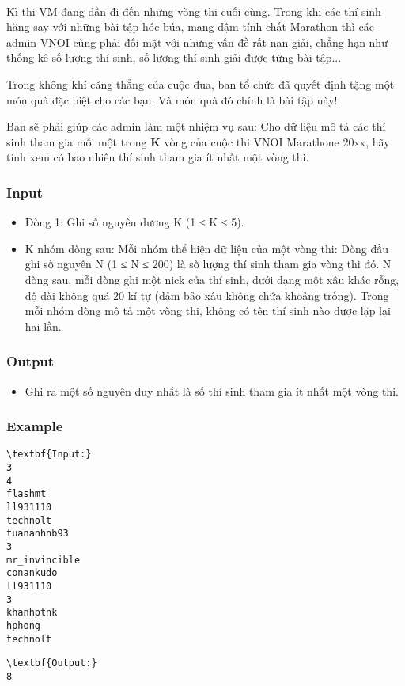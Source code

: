 

 

Kì thi VM đang dần đi đến những vòng thi cuối cùng. Trong khi các thí sinh hăng say với những bài tập hóc búa, mang đậm tính chất Marathon thì các admin VNOI cũng phải đối mặt với những vấn đề rất nan giải, chẳng hạn như thống kê số lượng thí sinh, số lượng thí sinh giải được từng bài tập...

Trong không khí căng thẳng của cuộc đua, ban tổ chức đã quyết định tặng một món quà đặc biệt cho các bạn. Và món quà đó chính là bài tập này!

Bạn sẽ phải giúp các admin làm một nhiệm vụ sau: Cho dữ liệu mô tả các thí sinh tham gia mỗi một trong \textbf{ K } vòng của cuộc thi VNOI Marathone 20xx, hãy tính xem có bao nhiêu thí sinh tham gia ít nhất một vòng thi.

\subsubsection{Input}
\begin{itemize}
	\item Dòng 1: Ghi số nguyên dương K (1 ≤ K ≤ 5).
	\item K nhóm dòng sau: Mỗi nhóm thể hiện dữ liệu của một vòng thi: Dòng đầu ghi số nguyên N (1 ≤ N ≤ 200) là số lượng thí sinh tham gia vòng thi đó. N dòng sau, mỗi dòng ghi một nick của thí sinh, dưới dạng một xâu khác rỗng, độ dài không quá 20 kí tự (đảm bảo xâu không chứa khoảng trống). Trong mỗi nhóm dòng mô tả một vòng thi, không có tên thí sinh nào được lặp lại hai lần.
\end{itemize}

\subsubsection{Output}
\begin{itemize}
	\item Ghi ra một số nguyên duy nhất là số thí sinh tham gia ít nhất một vòng thi.
\end{itemize}

\subsubsection{Example}
\begin{verbatim}
\textbf{Input:}
3
4
flashmt
ll931110
technolt
tuananhnb93
3
mr_invincible
conankudo
ll931110
3
khanhptnk
hphong
technolt\end{verbatim}
\begin{verbatim}
\textbf{Output:}
8\end{verbatim}